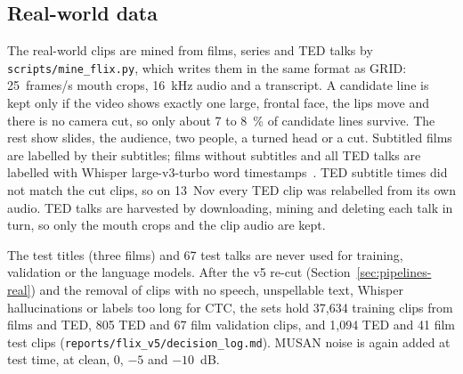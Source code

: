 \subsection{Real-world data}
The real-world clips are mined from films, series and TED talks by
\texttt{scripts/\allowbreak{}mine\_\allowbreak{}flix.py}, which writes them in the same format as GRID: 25~frames/s mouth
crops, 16~kHz audio and a transcript. A candidate line is kept only if the video shows exactly one
large, frontal face, the lips move and there is no camera cut, so only about 7 to 8~\% of
candidate lines survive. The rest show slides, the audience, two people, a turned head or a cut.
Subtitled films are labelled by their subtitles; films without subtitles and all TED talks are
labelled with Whisper large-v3-turbo word timestamps~\cite{radford2023whisper}. TED subtitle times
did not match the cut clips, so on 13~Nov every TED clip was relabelled from its own audio. TED
talks are harvested by downloading, mining and deleting each talk in turn, so only the mouth crops
and the clip audio are kept.

The test titles (three films) and 67 test talks are never used for training, validation or the
language models. After the v5 re-cut (Section~\ref{sec:pipelines-real}) and the removal of clips
with no speech, unspellable text, Whisper hallucinations or labels too long for CTC, the sets hold
37,634 training clips from films and TED, 805 TED and 67 film validation clips, and 1,094 TED and
41 film test clips (\texttt{reports/\allowbreak{}flix\_\allowbreak{}v5/\allowbreak{}decision\_\allowbreak{}log.md}). MUSAN noise is again added at test
time, at clean, 0, $-5$ and $-10$~dB.
